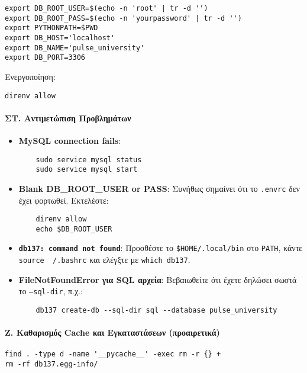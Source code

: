 \documentclass[13pt]{extarticle}
\begin{document}
\begin{verbatim}
export DB_ROOT_USER=$(echo -n 'root' | tr -d '')
export DB_ROOT_PASS=$(echo -n 'yourpassword' | tr -d '')
export PYTHONPATH=$PWD
export DB_HOST='localhost'
export DB_NAME='pulse_university'
export DB_PORT=3306
\end{verbatim}

Ενεργοποίηση:

\begin{verbatim}
direnv allow
\end{verbatim}

\paragraph{ΣΤ. Αντιμετώπιση Προβλημάτων}
\begin{itemize}
    \item \textbf{MySQL connection fails}:
    \begin{verbatim}
    sudo service mysql status
    sudo service mysql start
    \end{verbatim}

    \item \textbf{Blank DB\_ROOT\_USER or PASS}: Συνήθως σημαίνει ότι το \texttt{.envrc} δεν έχει φορτωθεί. Εκτελέστε:
    \begin{verbatim}
    direnv allow
    echo $DB_ROOT_USER
    \end{verbatim}

    \item \textbf{\texttt{db137: command not found}}: Προσθέστε το \texttt{\$HOME/.local/bin} στο \texttt{PATH}, κάντε \texttt{source ~/.bashrc} και ελέγξτε με \texttt{which db137}.

    \item \textbf{FileNotFoundError για SQL αρχεία}: Βεβαιωθείτε ότι έχετε δηλώσει σωστά το \texttt{--sql-dir}, π.χ.:
    \begin{verbatim}
    db137 create-db --sql-dir sql --database pulse_university
    \end{verbatim}
\end{itemize}

\paragraph{Ζ. Καθαρισμός Cache και Εγκαταστάσεων (προαιρετικά)}
\begin{verbatim}
find . -type d -name '__pycache__' -exec rm -r {} +
rm -rf db137.egg-info/
\end{verbatim}
\end{document}
